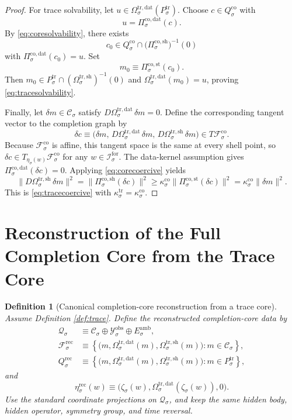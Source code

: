 \documentclass[11pt]{article}
\newcommand{\ForSpace}[1]{\mathcal I_{#1}^{\mathrm{for}}}
\newcommand{\DataSpace}[1]{\mathcal Y_{#1}^{\mathrm{obs}}}
\newcommand{\AmbientTarget}[1]{E_{#1}^{\mathrm{amb}}}
\newcommand{\CoreState}[1]{\mathcal C_{#1}}
\newcommand{\CoreSpace}[1]{\mathcal Q_{#1}}
\newcommand{\CoreAffine}[1]{\mathcal F_{#1}^{\mathrm{co}}}
\newcommand{\CoreBody}[1]{Q_{#1}^{\mathrm{co}}}
\newcommand{\CoreStateProj}[1]{\Pi_{#1}^{\mathrm{co,st}}}
\newcommand{\CoreDataProj}[1]{\Pi_{#1}^{\mathrm{co,dat}}}
\newcommand{\CoreShellProj}[1]{\Pi_{#1}^{\mathrm{co,sh}}}
\newcommand{\CoreEmbed}[1]{\eta_{#1}}
\newcommand{\TraceBody}[1]{P_{#1}^{\mathrm{tr}}}
\newcommand{\TraceDataMap}[1]{\Omega_{#1}^{\mathrm{tr,dat}}}
\newcommand{\TraceShellMap}[1]{\Omega_{#1}^{\mathrm{tr,sh}}}
\newcommand{\TraceEmbed}[1]{\zeta_{#1}}
\newcommand{\RecAffine}[1]{\mathcal F_{#1}^{\mathrm{rec}}}
\newcommand{\RecBody}[1]{Q_{#1}^{\mathrm{rec}}}
\newcommand{\RecEmbed}[1]{\eta_{#1}^{\mathrm{rec}}}
\newtheorem{definition}{Definition}
\begin{document}
\begin{proof}
For trace solvability, let \(u\in\TraceDataMap{\sigma}(\TraceBody{\sigma})\). Choose \(c\in\CoreBody{\sigma}\) with
\[
u=\CoreDataProj{\sigma}(c).
\]
By \eqref{eq:coresolvability}, there exists
\[
c_{0}\in\CoreBody{\sigma}\cap
\bigl(\CoreShellProj{\sigma}\bigr)^{-1}(0)
\]
with \(\CoreDataProj{\sigma}(c_{0})=u\). Set
\[
m_{0}\equiv\CoreStateProj{\sigma}(c_{0}).
\]
Then \(m_{0}\in\TraceBody{\sigma}\cap(\TraceShellMap{\sigma})^{-1}(0)\) and \(\TraceDataMap{\sigma}(m_{0})=u\), proving \eqref{eq:tracesolvability}.

Finally, let \(\delta m\in\CoreState{\sigma}\) satisfy \(D\TraceDataMap{\sigma}\,\delta m=0\). Define the corresponding tangent vector to the completion graph by
\[
\delta c
\equiv
\bigl(
\delta m,\,
D\TraceDataMap{\sigma}\,\delta m,\,
D\TraceShellMap{\sigma}\,\delta m
\bigr)
\in T\CoreAffine{\sigma}.
\]
Because \(\CoreAffine{\sigma}\) is affine, this tangent space is the same at every shell point, so \(\delta c\in T_{\CoreEmbed{\sigma}(w)}\CoreAffine{\sigma}\) for any \(w\in\ForSpace{\sigma}\). The data-kernel assumption gives \(\CoreDataProj{\sigma}(\delta c)=0\). Applying \eqref{eq:corecoercive} yields
\[
\bigl\|D\TraceShellMap{\sigma}\,\delta m\bigr\|^{2}
=
\bigl\|\CoreShellProj{\sigma}(\delta c)\bigr\|^{2}
\ge
\kappa_{\sigma}^{\mathrm{co}}
\bigl\|\CoreStateProj{\sigma}(\delta c)\bigr\|^{2}
=
\kappa_{\sigma}^{\mathrm{co}}\|\delta m\|^{2}.
\]
This is \eqref{eq:tracecoercive} with \(\kappa_{\sigma}^{\mathrm{tr}}=\kappa_{\sigma}^{\mathrm{co}}\).
\end{proof}

\section{Reconstruction of the Full Completion Core from the Trace Core}

\begin{definition}[Canonical completion-core reconstruction from a trace core]
\label{def:reconstruct}
Assume Definition \ref{def:trace}. Define the reconstructed completion-core data by
\begin{align}
\CoreSpace{\sigma}
&\equiv
\CoreState{\sigma}\oplus\DataSpace{\sigma}\oplus\AmbientTarget{\sigma},
\nonumber\\
\RecAffine{\sigma}
&\equiv
\left\{
\bigl(
m,\TraceDataMap{\sigma}(m),\TraceShellMap{\sigma}(m)
\bigr):
m\in\CoreState{\sigma}
\right\},
\label{eq:recaffine}\\
\RecBody{\sigma}
&\equiv
\left\{
\bigl(
m,\TraceDataMap{\sigma}(m),\TraceShellMap{\sigma}(m)
\bigr):
m\in\TraceBody{\sigma}
\right\},
\label{eq:recbody}
\end{align}
and
\begin{equation}
\RecEmbed{\sigma}(w)
\equiv
\bigl(
\TraceEmbed{\sigma}(w),
\TraceDataMap{\sigma}(\TraceEmbed{\sigma}(w)),
0
\bigr).
\label{eq:recembed}
\end{equation}
Use the standard coordinate projections on \(\CoreSpace{\sigma}\), and keep the same hidden body, hidden operator, symmetry group, and time reversal.
\end{definition}
\end{document}
